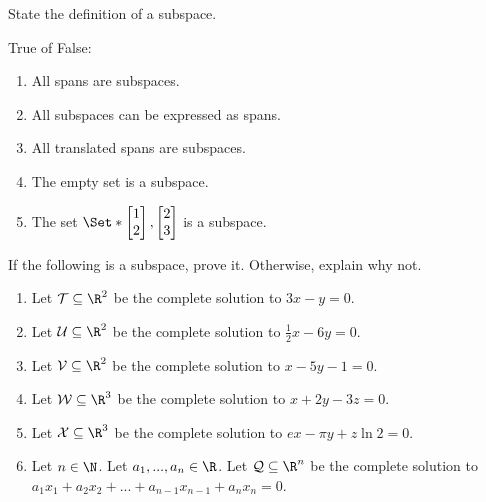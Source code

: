 \begin{exercises}
	\begin{problist}
		\prob  State the definition of a subspace.

		\prob  True of False:
		\begin{enumerate}
			\item All spans are subspaces.
			\item All subspaces can be expressed as spans.
			\item All translated spans are subspaces.
			\item The empty set is a subspace.
			\item The set $\Set*{\mat{1\\2}, \mat{2\\3}}$ is a subspace.
		\end{enumerate}

		\prob If the following is a subspace, prove it. Otherwise, explain why not.
		\begin{enumerate}
			\item Let $\mathcal T \subseteq \R^2$ be the complete solution to $3x-y=0$.
			\item Let $\mathcal U \subseteq \R^2$ be the complete solution to $\frac{1}{2}x-6y=0$.
			\item Let $\mathcal V \subseteq \R^2$ be the complete solution to $x-5y-1=0$.
			\item Let $\mathcal W \subseteq \R^3$ be the complete solution to $x+2y-3z=0$.
			\item Let $\mathcal X \subseteq \R^3$ be the complete solution to
			$ex-\pi y + z\ln 2=0$.
			\item Let $n \in \N$. Let $a_1,...,a_n \in \R$. Let $\mathcal Q \subseteq \R^n$ be the complete solution to $a_1x_1+a_2x_2+...+a_{n-1}x_{n-1}+a_nx_n=0$.
		\end{enumerate}


\end{problist}
\end{exercises}
